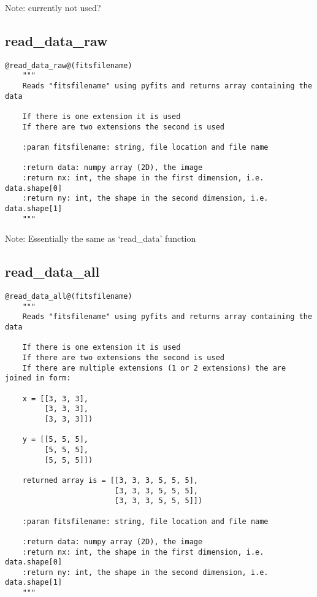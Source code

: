 \noindent Note: currently not used?

\subsection{read\_data\_raw}
\begin{lstlisting}[style=pythonstyle]
@read_data_raw@(fitsfilename)
    """
    Reads "fitsfilename" using pyfits and returns array containing the data

    If there is one extension it is used
    If there are two extensions the second is used

    :param fitsfilename: string, file location and file name

    :return data: numpy array (2D), the image
    :return nx: int, the shape in the first dimension, i.e. data.shape[0]
    :return ny: int, the shape in the second dimension, i.e. data.shape[1]
    """
\end{lstlisting}

\noindent Note: Essentially the same as `read\_data' function

\subsection{read\_data\_all}
\begin{lstlisting}[style=pythonstyle]
@read_data_all@(fitsfilename)
    """
    Reads "fitsfilename" using pyfits and returns array containing the data

    If there is one extension it is used
    If there are two extensions the second is used
    If there are multiple extensions (1 or 2 extensions) the are joined in form:

    x = [[3, 3, 3],
         [3, 3, 3],
         [3, 3, 3]])

    y = [[5, 5, 5],
         [5, 5, 5],
         [5, 5, 5]])

    returned array is = [[3, 3, 3, 5, 5, 5],
                         [3, 3, 3, 5, 5, 5],
                         [3, 3, 3, 5, 5, 5]])

    :param fitsfilename: string, file location and file name

    :return data: numpy array (2D), the image
    :return nx: int, the shape in the first dimension, i.e. data.shape[0]
    :return ny: int, the shape in the second dimension, i.e. data.shape[1]
    """

\end{lstlisting}

\vspace{0.5cm}
